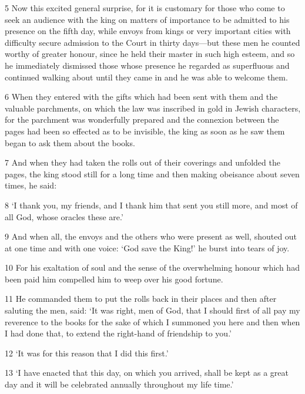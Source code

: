 \par 5 Now this excited general surprise, for it is customary for those who come to seek an audience with the king on matters of importance to be admitted to his presence on the fifth day, while envoys from kings or very important cities with difficulty secure admission to the Court in thirty days—but these men he counted worthy of greater honour, since he held their master in such high esteem, and so he immediately dismissed those whose presence he regarded as superfluous and continued walking about until they came in and he was able to welcome them.

\par 6 When they entered with the gifts which had been sent with them and the valuable parchments, on which the law was inscribed in gold in Jewish characters, for the parchment was wonderfully prepared and the connexion between the pages had been so effected as to be invisible, the king as soon as he saw them began to ask them about the books.

\par 7 And when they had taken the rolls out of their coverings and unfolded the pages, the king stood still for a long time and then making obeisance about seven times, he said:

\par 8 ‘I thank you, my friends, and I thank him that sent you still more, and most of all God, whose oracles these are.’

\par 9 And when all, the envoys and the others who were present as well, shouted out at one time and with one voice: ‘God save the King!’ he burst into tears of joy.

\par 10 For his exaltation of soul and the sense of the overwhelming honour which had been paid him compelled him to weep over his good fortune.

\par 11 He commanded them to put the rolls back in their places and then after saluting the men, said: ‘It was right, men of God, that I should first of all pay my reverence to the books for the sake of which I summoned you here and then when I had done that, to extend the right-hand of friendship to you.’

\par 12 ‘It was for this reason that I did this first.’

\par 13 ‘I have enacted that this day, on which you arrived, shall be kept as a great day and it will be celebrated annually throughout my life time.’

